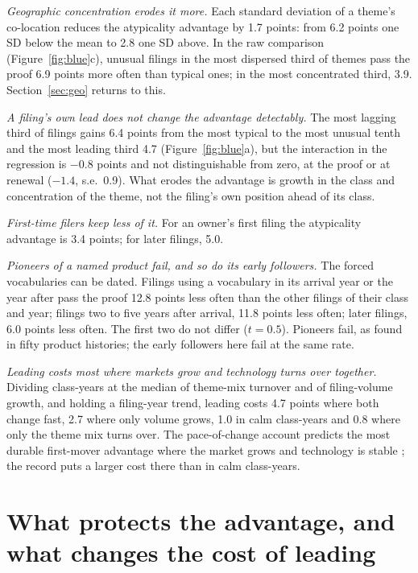\emph{Geographic concentration erodes it more.} Each standard deviation
of a theme's co-location reduces the atypicality advantage by 1.7
points: from 6.2 points one SD below the mean to 2.8 one SD above. In
the raw comparison (Figure~\ref{fig:blue}c), unusual filings in the most
dispersed third of themes pass the proof 6.9 points more often than
typical ones; in the most concentrated third, 3.9. Section~\ref{sec:geo}
returns to this.

\emph{A filing's own lead does not change the advantage detectably.} The
most lagging third of filings gains 6.4 points from the most typical to
the most unusual tenth and the most leading third 4.7
(Figure~\ref{fig:blue}a), but the interaction in the regression is
$-0.8$ points and not distinguishable from zero, at the proof or at
renewal ($-1.4$, s.e.\ 0.9). What erodes the advantage is growth in the
class and concentration of the theme, not the filing's own position
ahead of its class.

\emph{First-time filers keep less of it.} For an owner's first filing the
atypicality advantage is 3.4 points; for later filings, 5.0.

\emph{Pioneers of a named product fail, and so do its early followers.}
The forced vocabularies can be dated. Filings using a vocabulary in its
arrival year or the year after pass the proof 12.8 points less often
than the other filings of their class and year; filings two to five
years after arrival, 11.8 points less often; later filings, 6.0 points
less often. The first two do not differ ($t = 0.5$). Pioneers fail, as
\citet{GolderTellis1993} found in fifty product histories; the early
followers here fail at the same rate.

\emph{Leading costs most where markets grow and technology turns over
together.} Dividing class-years at the median of theme-mix turnover and
of filing-volume growth, and holding a filing-year trend, leading costs
4.7 points where both change fast, 2.7 where only volume grows, 1.0 in
calm class-years and 0.8 where only the theme mix turns over. The
pace-of-change account predicts the most durable first-mover advantage
where the market grows and technology is stable
\citep{SuarezLanzolla2007}; the record puts a larger cost there than in
calm class-years.

\section{What protects the advantage, and what changes the cost of
leading}\label{sec:protect}

